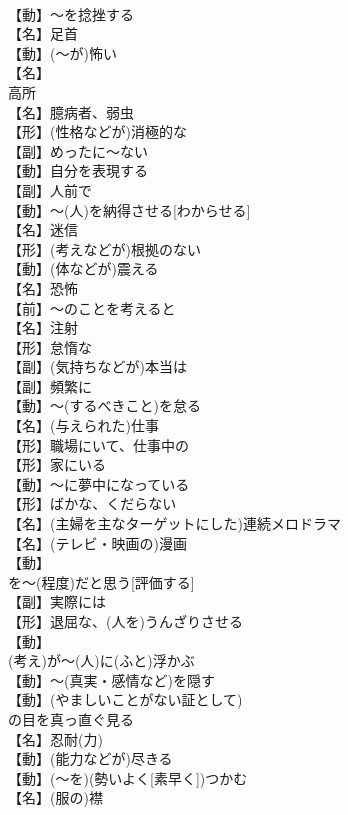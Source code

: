 \documentclass[8pt]{extreport}
\begin{document}
\begin{CJK}{UTF8}{min}
\\	【動】～を捻挫する
\\	【名】足首
\\	【動】(～が)怖い
\\	【名】
\\	高所
\\	【名】臆病者、弱虫
\\	【形】(性格などが)消極的な
\\	【副】めったに～ない
\\	【動】自分を表現する
\\	【副】人前で
\\	【動】～(人)を納得させる[わからせる]
\\	【名】迷信
\\	【形】(考えなどが)根拠のない
\\	【動】(体などが)震える
\\	【名】恐怖
\\	【前】～のことを考えると
\\	【名】注射
\\	【形】怠惰な
\\	【副】(気持ちなどが)本当は
\\	【副】頻繁に
\\	【動】～(するべきこと)を怠る
\\	【名】(与えられた)仕事
\\	【形】職場にいて、仕事中の
\\	【形】家にいる
\\	【動】～に夢中になっている
\\	【形】ばかな、くだらない
\\	【名】(主婦を主なターゲットにした)連続メロドラマ
\\	【名】(テレビ・映画の)漫画
\\	【動】
\\	を～(程度)だと思う[評価する]
\\	【副】実際には
\\	【形】退屈な、(人を)うんざりさせる
\\	【動】
\\	(考え)が～(人)に(ふと)浮かぶ
\\	【動】～(真実・感情など)を隠す
\\	【動】(やましいことがない証として)
\\	の目を真っ直ぐ見る
\\	【名】忍耐(力)
\\	【動】(能力などが)尽きる
\\	【動】(～を)(勢いよく[素早く])つかむ
\\	【名】(服の)襟

\end{CJK}
\end{document}

